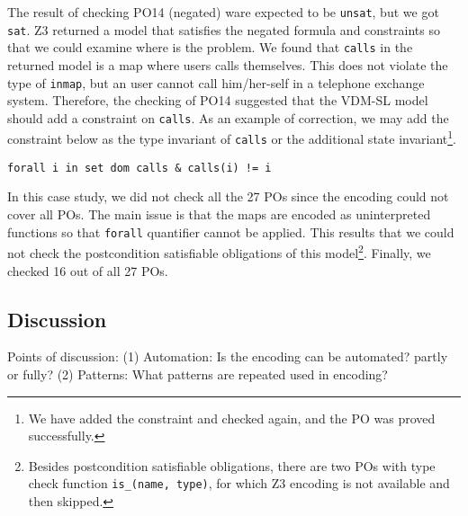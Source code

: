 The result of checking PO14 (negated) ware expected to be {\tt unsat}, but we got {\tt sat}. Z3 returned a model that satisfies the negated formula and constraints so that we could examine where is the problem. We found that {\tt calls} in the returned model is a map where users calls themselves. This does not violate the type of {\tt inmap}, but an user cannot call him/her-self in a telephone exchange system. Therefore, the checking of PO14 suggested that the VDM-SL model should add a constraint on {\tt calls}. As an example of correction, we may add the constraint below as the type invariant of {\tt calls} or the additional state invariant\footnote{We have added the constraint and checked again, and the PO was proved successfully.}.

\begin{mdframed}[roundcorner=5pt]
\begin{Verbatim}[fontsize=\small]
forall i in set dom calls & calls(i) != i
\end{Verbatim}
\end{mdframed}

In this case study, we did not check all the 27 POs since the encoding could not cover all POs. The main issue is that the maps are encoded as uninterpreted functions so that {\tt forall} quantifier cannot be applied. This results that we could not check the postcondition satisfiable obligations of this model\footnote{Besides postcondition satisfiable obligations, there are two POs with type check function {\tt is\_(name, type)}, for which Z3 encoding is not available and then skipped.}. Finally, we checked 16 out of all 27 POs.

\subsection{Discussion}



Points of discussion:
(1) Automation: Is the encoding can be automated? partly or fully? 
(2) Patterns: What patterns are repeated used in encoding?

